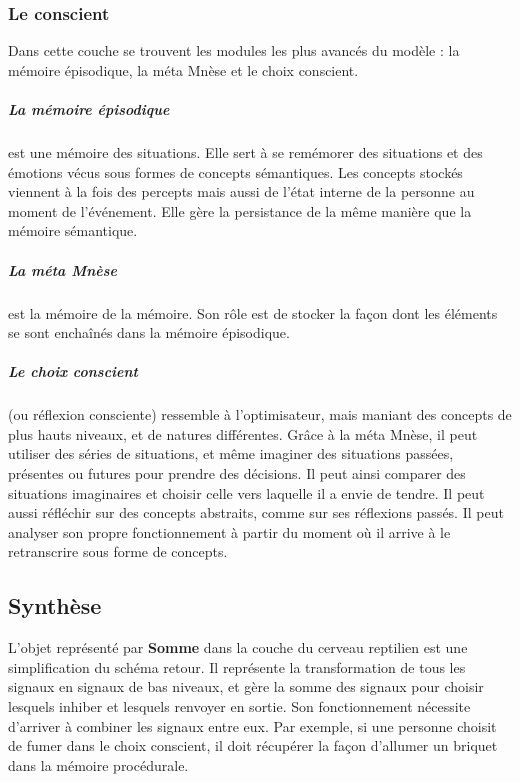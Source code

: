 \subsubsection{Le conscient} Dans cette couche se trouvent les modules les plus
avancés du modèle : la mémoire épisodique, la méta Mnèse  et le choix conscient.
\subparagraph{La mémoire épisodique} est une mémoire des situations. Elle sert à
se remémorer des situations et des émotions vécus sous formes de concepts sémantiques. Les
concepts stockés viennent à la fois des percepts mais aussi de l’état interne de
la personne au moment de l’événement. Elle gère la persistance de la même
manière que la mémoire sémantique.
\subparagraph{La méta Mnèse} est la mémoire de la mémoire. Son rôle est de stocker la
façon dont les éléments se sont enchaînés dans la mémoire épisodique.
\subparagraph{Le choix conscient} (ou réflexion consciente) ressemble à l'optimisateur,
mais maniant des concepts de plus hauts niveaux, et de natures différentes. Grâce à
la méta Mnèse, il peut utiliser des séries de situations, et même imaginer des
situations passées, présentes ou futures pour prendre des décisions. Il peut
ainsi comparer des situations imaginaires et choisir celle vers laquelle il a
envie de tendre. Il peut aussi réfléchir sur des concepts abstraits, comme sur
ses réflexions passés. Il peut analyser son propre fonctionnement à partir du
moment où il arrive à le retranscrire sous forme de concepts.
\subsection{Synthèse}
L’objet représenté par \textbf{Somme} dans la couche du cerveau reptilien
est une simplification du schéma retour. Il représente la transformation de tous les
signaux en signaux de bas niveaux, et gère la somme des signaux pour choisir
lesquels inhiber et lesquels renvoyer en sortie. Son fonctionnement nécessite
d’arriver à combiner les signaux entre eux. Par exemple, si une personne choisit
de fumer dans le choix conscient, il doit récupérer la façon d’allumer un
briquet dans la mémoire procédurale.
